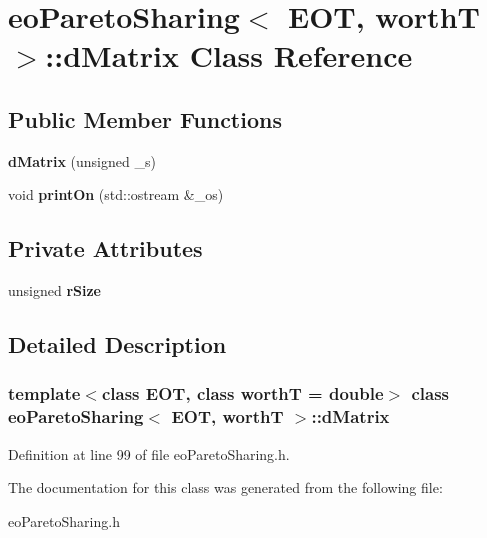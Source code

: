 \section{eo\-Pareto\-Sharing$<$ EOT, worth\-T $>$::d\-Matrix Class Reference}
\label{classeoParetoSharing_1_1dMatrix}
\subsection*{Public Member Functions}
\begin{CompactItemize}
\item 
{\bf d\-Matrix} (unsigned \_\-s)\label{classeoParetoSharing_1_1dMatrix_0cff6678bc7af1fd6d620a472b6c9ee5}

\item 
void {\bf print\-On} (std::ostream \&\_\-os)\label{classeoParetoSharing_1_1dMatrix_0a331635c3125c5d936f30b34d3b4bcd}

\end{CompactItemize}
\subsection*{Private Attributes}
\begin{CompactItemize}
\item 
unsigned {\bf r\-Size}\label{classeoParetoSharing_1_1dMatrix_767481759c7990f6a90c581e0fd0a0dd}

\end{CompactItemize}


\subsection{Detailed Description}
\subsubsection*{template$<$class EOT, class worth\-T = double$>$ class eo\-Pareto\-Sharing$<$ EOT, worth\-T $>$::d\-Matrix}





Definition at line 99 of file eo\-Pareto\-Sharing.h.

The documentation for this class was generated from the following file:\begin{CompactItemize}
\item 
eo\-Pareto\-Sharing.h\end{CompactItemize}
